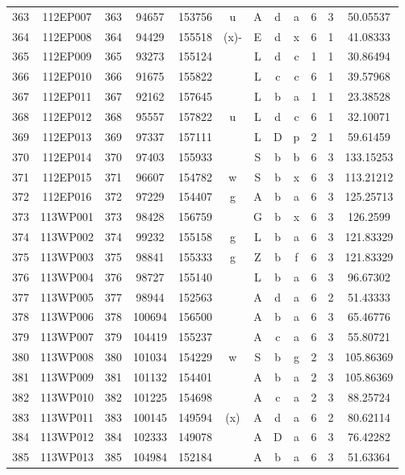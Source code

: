 \begin{tabular}{|*{12}{c|}}
363 & 112EP007 & 363 & 94657 & 153756 & u & A & d & a & 6 & 3 & 50.05537 \\ 
364 & 112EP008 & 364 & 94429 & 155518 & (x)- & E & d & x & 6 & 1 & 41.08333 \\ 
365 & 112EP009 & 365 & 93273 & 155124 &  & L & d & c & 1 & 1 & 30.86494 \\ 
366 & 112EP010 & 366 & 91675 & 155822 &  & L & c & c & 6 & 1 & 39.57968 \\ 
367 & 112EP011 & 367 & 92162 & 157645 &  & L & b & a & 1 & 1 & 23.38528 \\ 
368 & 112EP012 & 368 & 95557 & 157822 & u & L & d & c & 6 & 1 & 32.10071 \\ 
369 & 112EP013 & 369 & 97337 & 157111 &  & L & D & p & 2 & 1 & 59.61459 \\ 
370 & 112EP014 & 370 & 97403 & 155933 &  & S & b & b & 6 & 3 & 133.15253 \\ 
371 & 112EP015 & 371 & 96607 & 154782 & w & S & b & x & 6 & 3 & 113.21212 \\ 
372 & 112EP016 & 372 & 97229 & 154407 & g & A & b & a & 6 & 3 & 125.25713 \\ 
373 & 113WP001 & 373 & 98428 & 156759 &  & G & b & x & 6 & 3 & 126.2599 \\ 
374 & 113WP002 & 374 & 99232 & 155158 & g & L & b & a & 6 & 3 & 121.83329 \\ 
375 & 113WP003 & 375 & 98841 & 155333 & g & Z & b & f & 6 & 3 & 121.83329 \\ 
376 & 113WP004 & 376 & 98727 & 155140 &  & L & b & a & 6 & 3 & 96.67302 \\ 
377 & 113WP005 & 377 & 98944 & 152563 &  & A & d & a & 6 & 2 & 51.43333 \\ 
378 & 113WP006 & 378 & 100694 & 156500 &  & A & b & a & 6 & 3 & 65.46776 \\ 
379 & 113WP007 & 379 & 104419 & 155237 &  & A & c & a & 6 & 3 & 55.80721 \\ 
380 & 113WP008 & 380 & 101034 & 154229 & w & S & b & g & 2 & 3 & 105.86369 \\ 
381 & 113WP009 & 381 & 101132 & 154401 &  & A & b & a & 2 & 3 & 105.86369 \\ 
382 & 113WP010 & 382 & 101225 & 154698 &  & A & c & a & 2 & 3 & 88.25724 \\ 
383 & 113WP011 & 383 & 100145 & 149594 & (x) & A & d & a & 6 & 2 & 80.62114 \\ 
384 & 113WP012 & 384 & 102333 & 149078 &  & A & D & a & 6 & 3 & 76.42282 \\ 
385 & 113WP013 & 385 & 104984 & 152184 &  & A & b & a & 6 & 3 & 51.63364 \\ 

\end{tabular}
